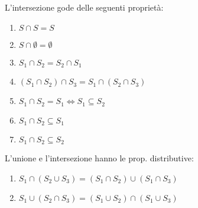 
\begin{prop}
    L'intersezione gode delle seguenti proprietà:
\end{prop}
\begin{enumerate}
  \item $S \cap S = S$
  \item $S \cap \emptyset = \emptyset$
  \item $S_1 \cap S_2 = S_2 \cap S_1$
  \item $(S_1 \cap S_2) \cap S_3 = S_1 \cap (S_2 \cap S_3)$
  \item $S_1 \cap S_2 = S_1 \iff S_1 \subseteq S_2$
  \item $S_1 \cap S_2 \subseteq S_1$
  \item $S_1 \cap S_2 \subseteq S_2$
\end{enumerate}


\begin{prop}
L'unione e l'intersezione hanno le prop. distributive:
\end{prop}
\begin{enumerate}
  \item $S_1 \cap (S_2 \cup S_3) = (S_1 \cap S_2) \cup (S_1 \cap S_3)$
  \item $S_1 \cup (S_2 \cap S_3) = (S_1 \cup S_2) \cap (S_1 \cup S_3)$
\end{enumerate}


